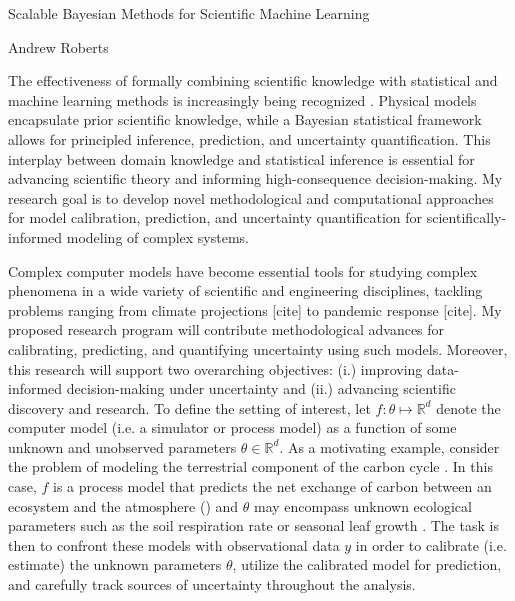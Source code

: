 \documentclass[12pt]{article}
\newcommand{\R}{\mathcal{R}}
\def\R{\mathbb{R}}
\begin{document}
\begin{center}
Scalable Bayesian Methods for Scientific Machine Learning
\end{center}

\begin{flushright}
Andrew Roberts
\end{flushright} 

The effectiveness of formally combining scientific knowledge with statistical and machine learning methods is increasingly being recognized \cite{Willcox}. Physical models
encapsulate prior scientific knowledge, while a Bayesian statistical framework allows for principled inference, prediction, and uncertainty quantification. This interplay between domain 
knowledge and statistical inference is essential for advancing scientific theory and informing high-consequence decision-making. My research goal is to develop novel methodological 
and computational approaches for model calibration, prediction, and uncertainty quantification for scientifically-informed modeling of complex systems. 

Complex computer models have become essential tools for studying complex phenomena in a wide variety of scientific and engineering disciplines, 
tackling problems ranging from climate projections [cite] to pandemic response [cite]. My proposed research program will contribute methodological 
advances for calibrating, predicting, and quantifying uncertainty using such models. Moreover, this research will support two 
overarching objectives: (i.) improving data-informed decision-making under uncertainty and (ii.) advancing scientific discovery and research. To define the 
setting of interest, let $f: \theta \mapsto \R^d$ denote the computer model (i.e. a simulator or process model) as a function of some unknown and unobserved
parameters $\theta \in \R^d$. As a motivating example, consider the problem of modeling the terrestrial component of the carbon cycle \cite{Friedlingstein}. 
In this case, $f$ is a process model that predicts the net exchange of carbon between an ecosystem and the atmosphere (\cite{Waring}) and $\theta$ may encompass 
unknown ecological parameters such as the soil respiration rate or seasonal leaf growth \cite{Fer}. The task is then to confront these models with observational data $y$ in 
order to calibrate (i.e. estimate) the unknown parameters $\theta$, utilize the calibrated model for prediction, and carefully track sources of uncertainty throughout the analysis. 
\end{document}
